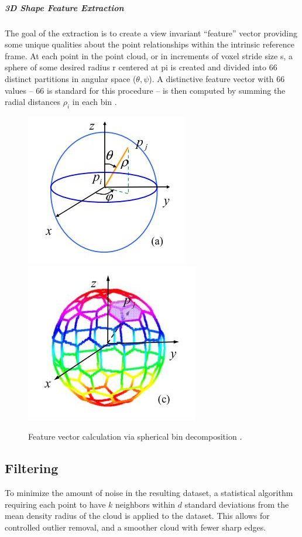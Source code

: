 \documentclass[12pt]{drexelthesis}
\let\Oldsubsection\subsection
\renewcommand{\subsection}{\FloatBarrier\Oldsubsection}
\begin{document}
\subparagraph{3D Shape Feature Extraction}
The goal of the extraction is to create a view invariant “feature” vector providing some unique qualities about the point relationships within the intrinsic reference frame. At each point in the point cloud, or in increments of voxel stride size s, a sphere of some desired radius r centered at pi is created and divided into 66 distinct partitions in angular space ($\theta, \psi$). A distinctive feature vector with 66 values -- 66 is standard for this procedure -- is then computed by summing the radial distances $\rho_{i}$ in each bin \cite{RN60}.

\begin{figure}[!ht]
	\centering
		\includegraphics{ISSfeaturevector2.jpg}  \includegraphics{ISSfeaturevector.jpg}
	\caption[Intrinsic Shape Signature feature vectors]{\centering Feature vector calculation via spherical bin decomposition \cite{RN60}.}
\end{figure}

\subsection{Filtering}
To minimize the amount of noise in the resulting dataset, a statistical algorithm requiring each point to have $k$ neighbors within $d$ standard deviations from the mean density radius of the cloud is applied to the dataset. This allows for controlled outlier removal, and a smoother cloud with fewer sharp edges.
\end{document}

